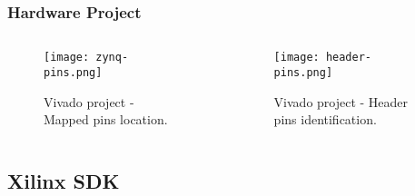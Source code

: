 \begin{frame}
	\frametitle{Hardware Project}
	\begin{columns}
		\begin{column}{0.5\textwidth}
			\begin{figure}
				\texttt{[image: zynq-pins.png]}
				\caption{Vivado project - Mapped pins location.}\label{fig:zynq-pins}
			\end{figure}
		\end{column}
		\begin{column}{0.5\textwidth}
			\begin{figure}
				\texttt{[image: header-pins.png]}
				\caption{Vivado project - Header pins identification.}\label{fig:header-pins}
			\end{figure}
		\end{column}
	\end{columns}
\end{frame}

% 

\subsection{Xilinx SDK}
